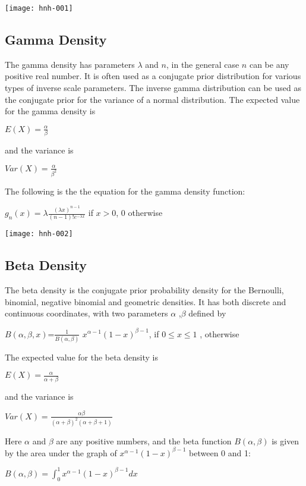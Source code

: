 \documentclass[11pt,a4paper]{article}
\theoremstyle{plain}
\begin{document}
\texttt{[image: hnh-001]}


\subsection*{Gamma Density}
The gamma density has parameters $\lambda$ and $n$, in the general case $n$ can be any positive real number.
It is often used as a conjugate prior distribution for various types of inverse scale parameters. The inverse gamma distribution can be used as the conjugate prior for the variance of a normal distribution. 
The expected value for the gamma density is
\begin{center}
$E(X)=\frac{\alpha}{\beta}$ 
\end{center}
and the variance is 
\begin{center}
$Var(X)=\frac{\alpha}{\beta^2}$
\end{center}
The following is the the equation for the gamma density function:
\begin{center}{$g_n(x)=\lambda \frac{(\lambda x)^{n-1}}{(n-1)!e^{-\lambda x}}$ if $x>0 $, 0 otherwise}
\end{center}


\texttt{[image: hnh-002]}



\subsection*{Beta Density} 
The beta density is the conjugate prior probability density for the Bernoulli, binomial, negative binomial and geometric densities. It has both discrete and continuous coordinates, with two parameters $\alpha$ ,$\beta$ defined by 
\begin{center}$B(\alpha, \beta, x)$=$\frac {1}{B(\alpha, \beta)}$ $x^{\alpha-1}(1-x)^{\beta-1}$, if $ 0 \leq x \leq 1$ ,
 otherwise
\end{center}
The expected value for the beta density is
\begin{center}
$E(X)=\frac{\alpha}{\alpha+\beta}$ 
\end{center}
and the variance is 
\begin{center}
$Var(X)=\frac{\alpha\beta}{(\alpha+\beta)^2(\alpha+\beta+1)}$
\end{center}

{Here $\alpha$ and $\beta$ are any positive numbers, and the beta function $B(\alpha,\beta)$ is given by the area under the graph of $x^{\alpha-1}(1-x)^{\beta-1}$ between 0 and 1:}
\begin{center}$B(\alpha, \beta)=\int_0^1 x^{\alpha-1}(1-x)^{\beta-1}dx$ 
\end{center}
\end{document}
